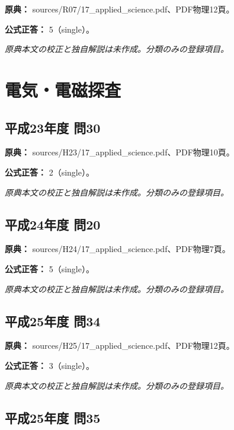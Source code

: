 \noindent\textbf{原典：} sources/R07/17\_applied\_science.pdf、PDF物理12頁。

\textbf{公式正答：} 5（single）。

\par\textit{原典本文の校正と独自解説は未作成。分類のみの登録項目。}

\section{電気・電磁探査}

\subsection{平成23年度 問30}
\label{q:h23-reg-applied-30}

\noindent\textbf{原典：} sources/H23/17\_applied\_science.pdf、PDF物理10頁。

\textbf{公式正答：} 2（single）。

\par\textit{原典本文の校正と独自解説は未作成。分類のみの登録項目。}

\subsection{平成24年度 問20}
\label{q:h24-reg-applied-20}

\noindent\textbf{原典：} sources/H24/17\_applied\_science.pdf、PDF物理7頁。

\textbf{公式正答：} 5（single）。

\par\textit{原典本文の校正と独自解説は未作成。分類のみの登録項目。}

\subsection{平成25年度 問34}
\label{q:h25-reg-applied-34}

\noindent\textbf{原典：} sources/H25/17\_applied\_science.pdf、PDF物理12頁。

\textbf{公式正答：} 3（single）。

\par\textit{原典本文の校正と独自解説は未作成。分類のみの登録項目。}

\subsection{平成25年度 問35}
\label{q:h25-reg-applied-35}

